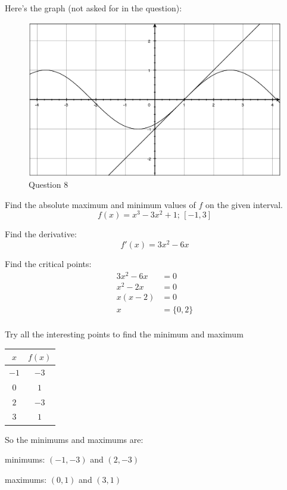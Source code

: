 \documentclass[fleqn,addpoints]{exam}
\begin{document}
\begin{questions}
\begin{solution}
Here's the graph (not asked for in the question):
\begin{figure}[H]
  \centering
  \includegraphics[scale=.3]{final_7_q8.eps}
  \caption*{Question 8}
\end{figure}

\end{solution}

\question Find the absolute maximum and minimum values of $f$ on the given interval.
\[
  f(x) = x^3 - 3x^2 + 1 \text{; } [-1, 3]
\]
\begin{solution}
Find the derivative:
\[
  f'(x) = 3x^2 - 6x
\]

Find the critical points:
\begin{align*}
  3x^2 - 6x &= 0 \\
  x^2 - 2x &= 0 \\
  x(x - 2) &= 0 \\
  x &= \{0, 2\} \\
\end{align*}

Try all the interesting points to find the minimum and maximum
\begin{tabular}{cc}
\toprule
$x$ & $f(x)$ \\
\midrule
$-1$  & $-3$ \\
$0$  & $1$ \\
$2$  & $-3$ \\
$3$  & $1$ \\
\bottomrule
\end{tabular}

So the minimums and maximums are:
\begin{itemize*}
\item minimums: $(-1, -3)$ and $(2, -3)$
\item maximums: $(0, 1)$ and $(3, 1)$
\end{itemize*}


\end{solution}
\end{questions}
\end{document}
